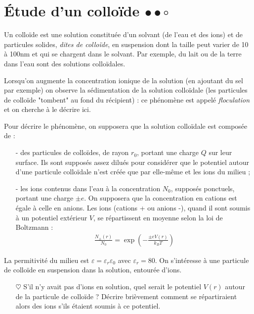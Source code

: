 \documentclass{report}
\begin{document}
\newpage

\section*{Étude d'un colloïde $\bullet\bullet\circ$}

Un colloïde est une solution constituée d'un solvant (de l'eau et des ions) et de particules solides, \textit{dites de colloïde}, en suspension dont la taille peut varier de 10 à 100nm et qui se chargent dans le solvant. Par exemple, du lait ou de la terre dans l'eau sont des solutions colloïdales.

Lorsqu'on augmente la concentration ionique de la solution (en ajoutant du sel par exemple) on observe la sédimentation de la solution colloïdale (les particules de colloïde "tombent" au fond du récipient) : ce phénomène est appelé \textit{floculation} et on cherche à le décrire ici.

Pour décrire le phénomène, on supposera que la solution colloïdale est composée de :
\begin{itemize}
	\item[-] des particules de colloïdes, de rayon $r_0$, portant une charge $Q$ sur leur surface. Ils sont supposés assez dilués pour considérer que le potentiel autour d'une particule colloïdale n'est créée que par elle-même et les ions du milieu ;
	\item[-] les ions contenus dans l'eau à la concentration $N_0$, supposés ponctuels, portant une charge $\pm e$. On supposera que la concentration en cations est égale à celle en anions. Les ions (cations + ou anions -), quand il sont soumis à un potentiel extérieur $V$, se répartissent en moyenne selon la loi de Boltzmann :
\begin{align*}
	\frac{N_{\pm}(r)}{N_0}=\exp\left(-\frac{\pm eV(r)}{k_BT} \right) 
\end{align*}
\end{itemize}
La permitivité du milieu est $\varepsilon=\varepsilon_r\varepsilon_0$ avec $\varepsilon_r=80$. On s'intéresse à une particule de colloïde en suspension dans la solution, entourée d'ions.


\begin{itemize}

	\item[$\heartsuit$] S'il n'y avait pas d'ions en solution, quel serait le potentiel $V(r)$ autour de la particule de colloïde ? Décrire brièvement comment se répartiraient alors des ions s'ils étaient soumis à ce potentiel.

\end{itemize}
\end{document}

